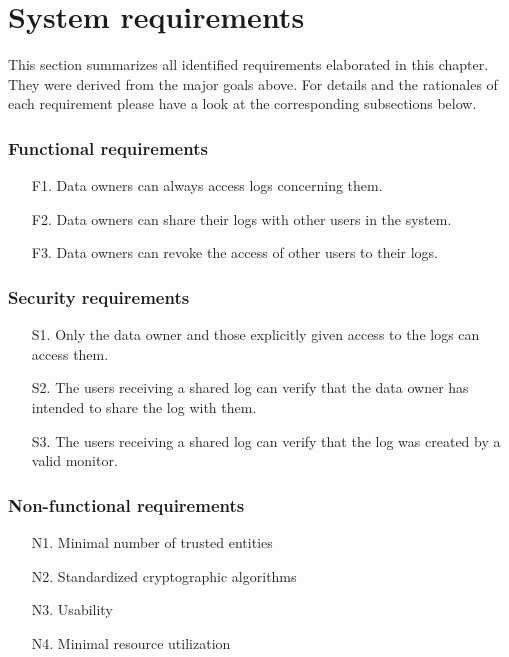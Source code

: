 \documentclass[../main.tex]{subfiles}
\begin{document}
\section{System requirements}\label{system-requriements}
This section summarizes all identified requirements elaborated in this chapter.
They were derived from the major goals above.
For details and the rationales of each requirement please have a look at the corresponding subsections below.

\subsubsection{Functional requirements}
\begin{itemize}
    \item [F1.] Data owners can always access logs concerning them.
    \item [F2.] Data owners can share their logs with other users in the system.
    \item [F3.] Data owners can revoke the access of other users to their logs.
\end{itemize}

\subsubsection{Security requirements}
\begin{itemize}
    \item [S1.] Only the data owner and those explicitly given access to the logs can access them.
    \item [S2.] The users receiving a shared log can verify that the data owner has intended to share the log with them.
    \item [S3.] The users receiving a shared log can verify that the log was created by a valid monitor.
\end{itemize}

\subsubsection{Non-functional requirements}
\begin{itemize}
    \item [N1.] Minimal number of trusted entities
    \item [N2.] Standardized cryptographic algorithms
    \item [N3.] Usability
    \item [N4.] Minimal resource utilization
\end{itemize}
\end{document}
